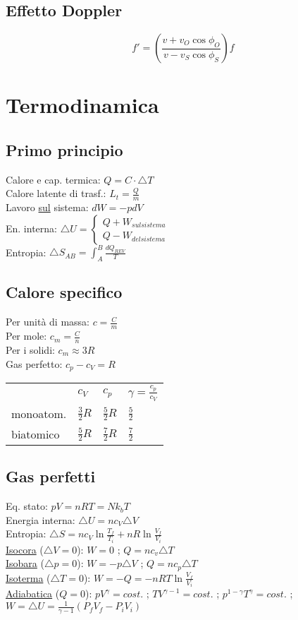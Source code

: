 \documentclass{article}
\begin{document}
\begin{small}
\begin{multicols}{3}
	\subsection{Effetto Doppler}
		\[ f' = ( \frac{ v + v_O \cos \phi_O }{ v - v_S \cos \phi_S } ) f \]
\section{Termodinamica}
	\subsection{Primo principio}
		Calore e cap. termica: $ Q = C \cdot \triangle T $ \\
		Calore latente di trasf.: $ L_t = \frac{ Q }{ m } $ \\
		Lavoro \underline{sul} sistema: $ d W = - p d V $ \\
		En. interna: $ \triangle U = \begin{cases} Q + W_{sul sistema} \\ Q - W_{del sistema} \end{cases} $ \\
		Entropia: $ \triangle S_{AB} = \int_{A}^{B} \frac{ d Q_{REV} }{ T } $
	\subsection{Calore specifico}
		Per unità di massa: $ c = \frac{ C }{ m } $ \\
		Per mole: $ c_m = \frac{ C }{ n } $ \\
		Per i solidi: $ c_m \approx 3 R $ \\
		Gas perfetto: $ c_p - c_V = R $ \\
		\begin{tabular}{l|lll}
			          & $c_V$             & $c_p$             & $\gamma = \frac{ c_p }{ c_V }$ \\
			monoatom. & $\frac{ 3 }{2} R$ & $\frac{ 5 }{2} R$ & $\frac{ 5 }{2}$ \\
			biatomico & $\frac{ 5 }{2} R$ & $\frac{ 7 }{2} R$ & $\frac{ 7 }{2}$
		\end{tabular}
	\subsection{Gas perfetti}
		Eq. stato: $ p V = n R T = N k_b T $ \\
		Energia interna: $ \triangle U = n c_V \triangle V $ \\
		Entropia: $ \triangle S = n c_V \ln \frac{ T_f }{ T_i } + n R \ln \frac{ V_f }{ V_i } $ \\
		\underline{Isocora} ($ \triangle V = 0 $): $ W = 0 $ ; $ Q = n c_v \triangle T $ \\
		\underline{Isobara} ($ \triangle p = 0 $): $ W = - p \triangle V $ ; $ Q = n c_p \triangle T $ \\
		\underline{Isoterma} ($ \triangle T = 0 $): $ W = - Q = - n R T \ln \frac{ V_f }{ V_i } $ \\
		\underline{Adiabatica} ($ Q = 0 $): $ p V^{\gamma} = cost.$ ; $ T V^{\gamma -1} = cost.$ ; $ p^{1 - \gamma} T^{\gamma} = cost.$ ;
					$ W = \triangle U = \frac{1}{ \gamma -1 } ( P_f V_f - P_i V_i ) $ 

\end{multicols}
\end{small}
\end{document}
